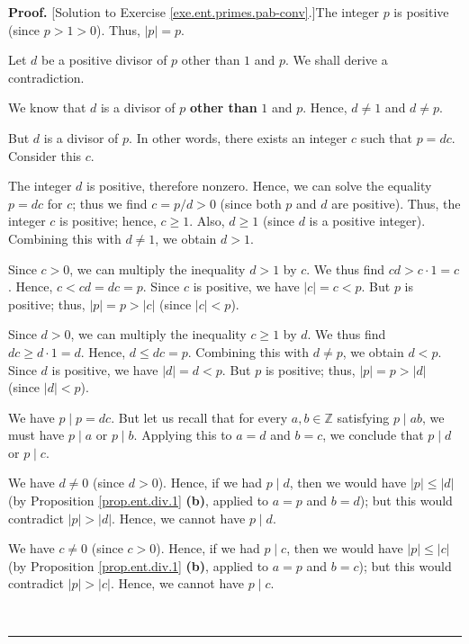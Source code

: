 \documentclass[numbers=enddot,12pt,final,onecolumn,notitlepage]{scrartcl}%
\numberwithin{exer}{subsection}
\theoremstyle{definition}
\newenvironment{fineprint}{\begin{small}}{\end{small}}
\newenvironment{proof}[1][Proof]{\noindent\textbf{#1.} }{\ \rule{0.5em}{0.5em}}
\begin{document}
\begin{fineprint}
\begin{proof}
[Solution to Exercise \ref{exe.ent.primes.pab-conv}.]The integer $p$ is
positive (since $p>1>0$). Thus, $\left\vert p\right\vert =p$.

Let $d$ be a positive divisor of $p$ other than $1$ and $p$. We shall derive a contradiction.

We know that $d$ is a divisor of $p$ \textbf{other than} $1$ and $p$. Hence,
$d\neq1$ and $d\neq p$.

But $d$ is a divisor of $p$. In other words, there exists an integer $c$ such
that $p=dc$. Consider this $c$.

The integer $d$ is positive, therefore nonzero. Hence, we can solve the
equality $p=dc$ for $c$; thus we find $c=p/d>0$ (since both $p$ and $d$ are
positive). Thus, the integer $c$ is positive; hence, $c\geq1$. Also, $d\geq1$
(since $d$ is a positive integer). Combining this with $d\neq1$, we obtain
$d>1$.

Since $c>0$, we can multiply the inequality $d>1$ by $c$. We thus find
$cd>c\cdot1=c$. Hence, $c<cd=dc=p$. Since $c$ is positive, we have $\left\vert
c\right\vert =c<p$. But $p$ is positive; thus, $\left\vert p\right\vert
=p>\left\vert c\right\vert $ (since $\left\vert c\right\vert <p$).

Since $d>0$, we can multiply the inequality $c\geq1$ by $d$. We thus find
$dc\geq d\cdot1=d$. Hence, $d\leq dc=p$. Combining this with $d\neq p$, we
obtain $d<p$. Since $d$ is positive, we have $\left\vert d\right\vert =d<p$.
But $p$ is positive; thus, $\left\vert p\right\vert =p>\left\vert d\right\vert
$ (since $\left\vert d\right\vert <p$).

We have $p\mid p=dc$. But let us recall that for every $a,b\in\mathbb{Z}$
satisfying $p\mid ab$, we must have $p\mid a$ or $p\mid b$. Applying this to
$a=d$ and $b=c$, we conclude that $p\mid d$ or $p\mid c$.

We have $d\neq0$ (since $d>0$). Hence, if we had $p\mid d$, then we would have
$\left\vert p\right\vert \leq\left\vert d\right\vert $ (by Proposition
\ref{prop.ent.div.1} \textbf{(b)}, applied to $a=p$ and $b=d$); but this would
contradict $\left\vert p\right\vert >\left\vert d\right\vert $. Hence, we
cannot have $p\mid d$.

We have $c\neq0$ (since $c>0$). Hence, if we had $p\mid c$, then we would have
$\left\vert p\right\vert \leq\left\vert c\right\vert $ (by Proposition
\ref{prop.ent.div.1} \textbf{(b)}, applied to $a=p$ and $b=c$); but this would
contradict $\left\vert p\right\vert >\left\vert c\right\vert $. Hence, we
cannot have $p\mid c$.


\end{proof}
\end{fineprint}
\end{document}
